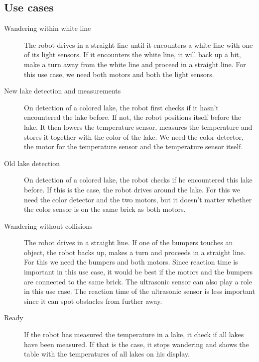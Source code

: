 \documentclass[11pt,a4paper]{article}
\begin{document}
\subsection{Use cases}
\begin{description}
\item[Wandering within white line] The robot drives in a straight line until it encounters a white line with one of its light sensors. If it encounters the white line, it will back up a bit, make a turn away from the white line and proceed in a straight line. For this use case, we need both motors and both the light sensors.
\item[New lake detection and measurements] On detection of a colored lake, the robot first checks if it hasn't encountered the lake before. If not, the robot positions itself before the lake. It then lowers the temperature sensor, measures the temperature and stores it together with the color of the lake. We need the color detector, the motor for the temperature sensor and the temperature sensor itself.
\item[Old lake detection] On detection of a colored lake, the robot checks if he encountered this lake before. If this is the case, the robot drives around the lake. For this we need the color detector and the two motors, but it doesn't matter whether the color sensor is on the same brick as both motors.
\item[Wandering without collisions] The robot drives in a straight line. If one of the bumpers touches an object, the robot backs up, makes a turn and proceeds in a straight line. For this we need the bumpers and both motors. Since reaction time is important in this use case, it would be best if the motors and the bumpers are connected to the same brick. The ultrasonic sensor can also play a role in this use case. The reaction time of the ultrasonic sensor is less important since it can spot obstacles from further away. %
\item[Ready] If the robot has measured the temperature in a lake, it check if all lakes have been measured. If that is the case, it stops wandering and shows the table with the temperatures of all lakes on his display.\\
\end{description}
\end{document}

